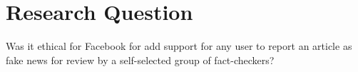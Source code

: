 
\section{Research Question}


Was it ethical for Facebook for add support for any user to report an article as fake news for review by a self-selected group of fact-checkers?